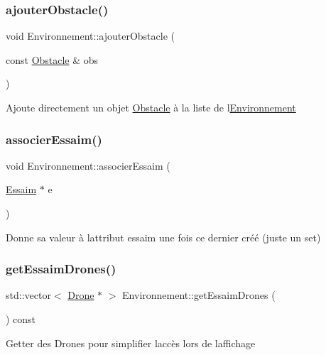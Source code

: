 \subsubsection{\texorpdfstring{ajouter\+Obstacle()}{ajouterObstacle()}}
{\footnotesize\ttfamily void Environnement\+::ajouter\+Obstacle (\begin{DoxyParamCaption}\item[{const \mbox{\hyperlink{class_obstacle}{Obstacle}} \&}]{obs }\end{DoxyParamCaption})}

Ajoute directement un objet \mbox{\hyperlink{class_obstacle}{Obstacle}} à la liste de l\textquotesingle{}\mbox{\hyperlink{class_environnement}{Environnement}} \mbox{\label{class_environnement_aa4a7722b750e7628f571c2915ac8d51f}} 
\subsubsection{\texorpdfstring{associer\+Essaim()}{associerEssaim()}}
{\footnotesize\ttfamily void Environnement\+::associer\+Essaim (\begin{DoxyParamCaption}\item[{\mbox{\hyperlink{class_essaim}{Essaim}} $\ast$}]{e }\end{DoxyParamCaption})}

Donne sa valeur à l\textquotesingle{}attribut essaim une fois ce dernier créé (juste un set) \mbox{\label{class_environnement_a22fcd53c6a16d7aac217000f04efb064}} 
\subsubsection{\texorpdfstring{get\+Essaim\+Drones()}{getEssaimDrones()}}
{\footnotesize\ttfamily std\+::vector$<$ \mbox{\hyperlink{class_drone}{Drone}} $\ast$ $>$ Environnement\+::get\+Essaim\+Drones (\begin{DoxyParamCaption}{ }\end{DoxyParamCaption}) const}

Getter des Drones pour simplifier l\textquotesingle{}accès lors de l\textquotesingle{}affichage \mbox{\label{class_environnement_aab744830dace48734c8fc02a594a4a30}} 
